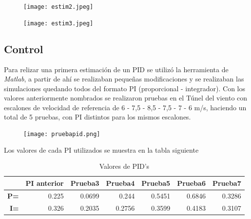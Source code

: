     \begin{figure}[htb]
    	\centering
    	\texttt{[image: estim2.jpeg]}
    	\label{fig:estim2}
    \end{figure}

\begin{figure}[htb]
	\centering
	\texttt{[image: estim3.jpeg]}
	\label{fig:estim3}
\end{figure}
    
       
    \subsection{Control}
    Para relizar una primera estimación de un PID se utilizó la herramienta de \textit{Matlab}, a partir de ahí se realizaban pequeñas modificaciones y se realizaban las simulaciones quedando todos del formato PI (proporcional - integrador).
    Con los valores anteriormente nombrados se realizaron pruebas en el Túnel del viento con escalones de velocidad de referencia de 6 - 7,5 - 8,5 - 7,5 - 7 - 6 m/s, haciendo un total de 5 pruebas, con PI distintos para los mismos escalones. 
    
    \begin{figure}[htb]
    	\centering
    	\texttt{[image: pruebapid.png]}
    	\label{fig:PI3}
    \end{figure}
    
    Los valores de cada PI utilizados se muestra en la tabla siguiente
    \begin{table}[h]
    	\centering
    	\begin{tabular}{r|r|r|r|r|r|r|}
    		\cline{2-7}
    		\multicolumn{1}{l|}{} & \multicolumn{1}{c|}{\textbf{PI anterior}} & \multicolumn{1}{c|}{\textbf{Prueba3}} & \multicolumn{1}{c|}{\textbf{Prueba4}} & \multicolumn{1}{c|}{\textbf{Prueba5}} & \multicolumn{1}{c|}{\textbf{Prueba6}} & \multicolumn{1}{c|}{\textbf{Prueba7}} \\ \hline
    		\multicolumn{1}{|r|}{\textbf{P=}} & 0.225 & 0.0699 & 0.244 & 0.5451 & 0.6846 & 0.3286 \\ \hline
    		\multicolumn{1}{|r|}{\textbf{I=}} & 0.326 & 0.2035 & 0.2756 & 0.3599 & 0.4183 & 0.3107 \\ \hline
    	\end{tabular}
    \caption{Valores de PID's}
    \end{table}
    

